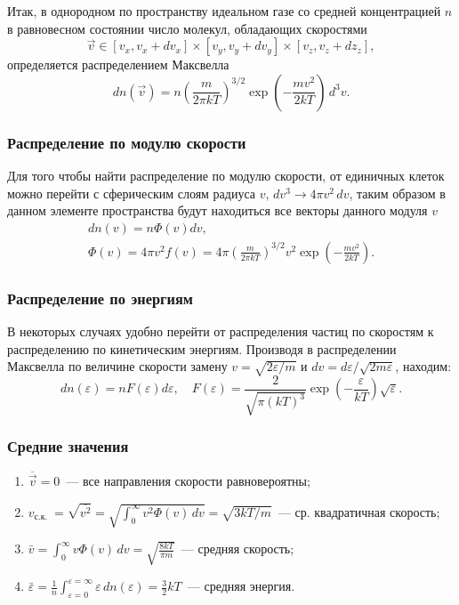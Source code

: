 Итак, в однородном по пространству идеальном газе со средней концентрацией $n$ в равновесном состоянии число молекул, обладающих скоростями
\begin{equation*}
    \vec{v} \in [v_x, v_x + d v_x] \times [v_y, v_y + d v_y] \times [v_z, v_z + d z_z],
\end{equation*}
определяется распределением Максвелла
\begin{equation}
    d n(\vec{v})
        = n \left(\frac{m}{2 \pi k T}\right)^{3 / 2} \exp \left(-\frac{m v^2}{2 k T}\right) \, d^3 v.
\end{equation}

\subsubsection{Распределение по модулю скорости}
Для того чтобы найти распределение по модулю скорости, от единичных клеток можно перейти с сферическим слоям радиуса $v, \, dv^3 \rightarrow 4 \pi v^2 \, dv$, таким образом в данном элементе пространства будут находиться все векторы данного модуля $v$
\begin{gather}
\nonumber d n(v)=n \Phi(v) d v,\\ 
\Phi(v)=4 \pi v^2 f(v)=4 \pi\left(\frac{m}{2 \pi k T}\right)^{3 / 2} v^2 \exp \left(-\frac{m v^2}{2 k T}\right).
\end{gather}

\subsubsection{Распределение по энергиям}
В некоторых случаях удобно перейти от распределения частиц по скоростям к распределению по кинетическим энергиям. Производя в распределении Максвелла по величине скорости замену $v=\sqrt{2 \varepsilon / m}$ и $d v=d \varepsilon / \sqrt{2 m \varepsilon}$, находим:
\begin{equation}
d n(\varepsilon)=n F(\varepsilon) d \varepsilon, \quad F(\varepsilon)=\frac{2}{\sqrt{\pi(k T)^3}} \exp \left(-\frac{\varepsilon}{k T}\right) \sqrt{\varepsilon}.
\end{equation}

\subsubsection{Средние значения}
\begin{enumerate}
	\item $\overline{\vec{v}} = 0$~--- все направления скорости равновероятны;
	\item $\displaystyle v_{\text {с.к. }} = \sqrt{\overline{v^2}}=\sqrt{\int_0^{\infty} v^2 \Phi(v) \, dv}=\sqrt{3 k T / m}$~--- ср. квадратичная скорость;
	\item $\displaystyle \bar{v}=\int_0^{\infty} v \Phi(v) \, dv=\sqrt{\frac{8 k T}{\pi m}}$~--- средняя скорость;
	\item $\displaystyle  \bar{\varepsilon} = \frac{1}{n} \int_{\varepsilon = 0}^{\varepsilon = \infty} \varepsilon \, d n(\varepsilon) = \frac{3}{2} k T$~--- средняя энергия.
\end{enumerate}

